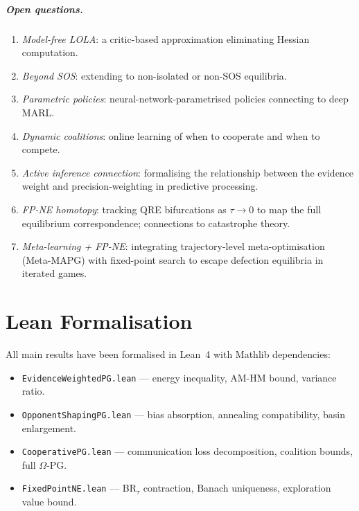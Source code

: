 \documentclass[a4paper,oneside,11pt]{report}
\begin{document}
\paragraph{Open questions.}
\begin{enumerate}
    \item \emph{Model-free LOLA}: a critic-based approximation eliminating Hessian computation.
    \item \emph{Beyond SOS}: extending to non-isolated or non-SOS equilibria.
    \item \emph{Parametric policies}: neural-network-parametrised policies connecting to deep MARL.
    \item \emph{Dynamic coalitions}: online learning of when to cooperate and when to compete.
    \item \emph{Active inference connection}: formalising the relationship between the evidence weight and precision-weighting in predictive processing.
    \item \emph{FP-NE homotopy}: tracking QRE bifurcations as $\tau \to 0$ to map the full equilibrium correspondence; connections to catastrophe theory.
    \item \emph{Meta-learning + FP-NE}: integrating trajectory-level meta-optimisation (Meta-MAPG) with fixed-point search to escape defection equilibria in iterated games.
\end{enumerate}


\appendix















\chapter{Lean Formalisation}
\label{app:lean}

All main results have been formalised in Lean~4 with Mathlib dependencies:
\begin{itemize}
    \item \texttt{EvidenceWeightedPG.lean} --- energy inequality, AM-HM bound, variance ratio.
    \item \texttt{OpponentShapingPG.lean} --- bias absorption, annealing compatibility, basin enlargement.
    \item \texttt{CooperativePG.lean} --- communication loss decomposition, coalition bounds, full $\Omega$-PG.
    \item \texttt{FixedPointNE.lean} --- BR$_\tau$ contraction, Banach uniqueness, exploration value bound.
\end{itemize}
\end{document}
